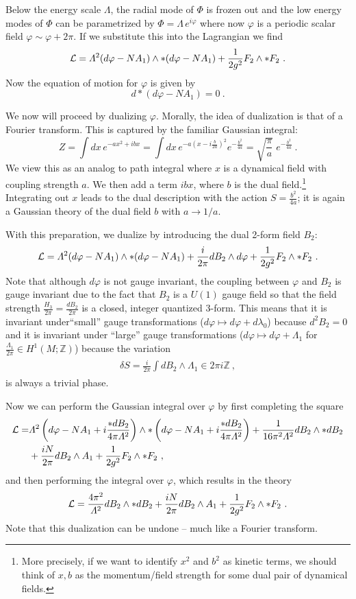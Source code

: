 \documentclass[11pt]{article}
\newcommand{\eq}[1]{\begin{align}\begin{split}#1\end{split}\end{align}}
\def\CL {{\cal L}}
\def\IZ{{\mathbb{Z}}}
\def\beq{\begin{equation}}
\def\eeq{\end{equation}}
\begin{document}
Below the energy scale $\Lambda$, the radial mode of $\Phi$ is frozen out  and the low energy modes of $\Phi$ can be parametrized by $\Phi=\Lambda\, e^{ i \varphi}$ where now $\varphi$ is a periodic scalar field $\varphi\sim \varphi+2\pi$. If we substitute this into the Lagrangian we find 
%
\eq{
\CL=\Lambda^2(d\varphi-N A_1)\wedge \ast (d\varphi - N A_1)+\frac{1}{2g^2}F_2\wedge \ast F_2~.
}
%
Now the equation of motion for $\varphi$ is given by 
%
\beq
d \ast  \left( d \varphi - N A_1 \right) = 0~.
\eeq 

We now will proceed by dualizing $\varphi$. Morally, the idea of dualization is that of a Fourier transform. This is captured by the
 familiar Gaussian integral:
%
\beq
Z = \int d x\, e^{-a x^2 + ib x} = \int dx \,e^{-a \left( x -i \frac{b}{2a} \right)^2} e^{-\frac{b^2}{4a}} = \sqrt{\frac{\pi}{a}} \; e^{-\frac{b^2}{4a}}~.
\eeq
%
We view this as an analog to path integral where $x$ is a dynamical field with coupling strength $a$. We then add a term $ibx$, where $b$ is the dual field.\footnote{
More precisely, if we want to identify $x^2$ and $b^2$ as kinetic terms, we should think of $x,b$ as the momentum/field strength for some dual pair of dynamical fields. 
}
 Integrating out $x$  leads to the dual description with the action $S = \frac{b^2}{4a}$; it is again a Gaussian theory of the dual field $b$ with $a \to 1/a$.

With this preparation, we dualize by introducing the dual 2-form field $B_2$:
%
\beq
 \CL=\Lambda^2(d\varphi-N A_1)\wedge \ast (d\varphi - N A_1) + \frac{i}{2\pi} dB_2\wedge  d\varphi +  \frac{1}{2g^2}F_2\wedge \ast F_2~.
\eeq
%
Note that although $d\varphi$ is not gauge invariant, the coupling between $\varphi$ and $B_2$ is gauge invariant   due to the fact that $B_2$ is a $U(1)$ gauge field so that the field strength $\frac{H_3}{2\pi} =\frac{dB_2}{2\pi}$ is a closed, integer quantized 3-form. This means that it is invariant under``small'' gauge transformations ($d\varphi\mapsto d\varphi+d\lambda_0$) because $d^2B_2=0$ and it is invariant under ``large'' gauge transformations ($d\varphi\mapsto d\varphi+ \Lambda_1$ for $\frac{\Lambda_1}{2\pi}\in H^1(M;\IZ)$) because the variation 
\eq{
\delta S=\frac{i}{2\pi}\int dB_2\wedge \Lambda_1\in2\pi i\IZ~,
}
is always a  trivial phase.

Now we can perform the Gaussian integral over $\varphi$ by first completing the square
%
\eq{
 \CL=&\Lambda^2\left(d\varphi-N A_1+ i \frac{\ast dB_2}{4\pi \Lambda^2}\right)\wedge \ast \left(d\varphi - N A_1+ i \frac{\ast dB_2}{4\pi \Lambda^2}\right) +\frac{1}{16\pi^2\Lambda^2} dB_2\wedge \ast dB_2\\
 &+ \frac{iN}{2\pi} dB_2\wedge  A_1 +  \frac{1}{2g^2}F_2\wedge \ast F_2~,
}
and then performing the integral over $\varphi$, which results in the theory 
\eq{
\CL=\frac{4\pi^2}{\Lambda^2}dB_2\wedge \ast dB_2+ \frac{iN}{2\pi} dB_2\wedge  A_1 +  \frac{1}{2g^2}F_2\wedge \ast F_2~.
} 
Note that this dualization can be undone -- much like a Fourier transform.  
\end{document}

